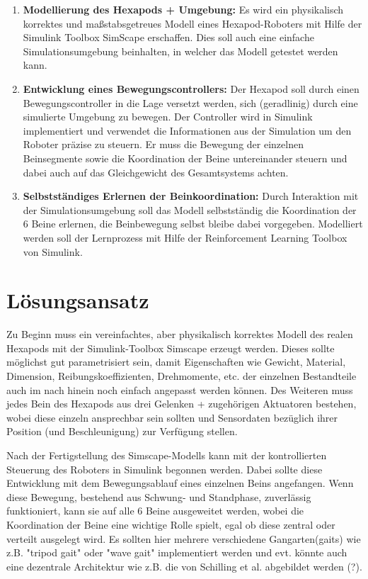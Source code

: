 \begin{enumerate}
	\item \textbf{Modellierung des Hexapods + Umgebung:} Es wird ein physikalisch korrektes und maßstabsgetreues Modell eines Hexapod-Roboters mit Hilfe der Simulink Toolbox SimScape erschaffen.
	Dies soll auch eine einfache Simulationsumgebung beinhalten, in welcher das Modell getestet werden kann. 
	
	\item \textbf{Entwicklung eines Bewegungscontrollers:} Der Hexapod soll durch einen Bewegungscontroller in die Lage versetzt werden, sich (geradlinig) durch eine simulierte Umgebung zu bewegen. 
	Der Controller wird in Simulink implementiert und verwendet die Informationen aus der Simulation um den Roboter präzise zu steuern.
	Er muss die Bewegung der einzelnen Beinsegmente sowie die Koordination der Beine untereinander steuern und dabei auch auf das Gleichgewicht des Gesamtsystems achten.
	
	\item \textbf{Selbstständiges Erlernen der Beinkoordination:} Durch Interaktion mit der Simulationsumgebung soll das Modell selbstständig die Koordination der 6 Beine erlernen, die Beinbewegung selbst bleibe dabei vorgegeben.
	Modelliert werden soll der Lernprozess mit Hilfe der Reinforcement Learning Toolbox von Simulink.
	
\end{enumerate}

\section{Lösungsansatz}
Zu Beginn muss ein vereinfachtes, aber physikalisch korrektes Modell des realen Hexapods mit der Simulink-Toolbox Simscape erzeugt werden.
Dieses sollte möglichst gut parametrisiert sein, damit Eigenschaften wie Gewicht, Material, Dimension, Reibungskoeffizienten, Drehmomente, etc. der einzelnen Bestandteile auch im nach hinein noch einfach angepasst werden können.
Des Weiteren muss jedes Bein des Hexapods aus drei Gelenken + zugehörigen Aktuatoren bestehen, wobei diese einzeln ansprechbar sein sollten und Sensordaten bezüglich ihrer Position (und Beschleunigung) zur Verfügung stellen.

Nach der Fertigstellung des Simscape-Modells kann mit der kontrollierten Steuerung des Roboters in Simulink begonnen werden.
Dabei sollte diese Entwicklung mit dem Bewegungsablauf eines einzelnen Beins angefangen.
Wenn diese Bewegung, bestehend aus Schwung- und Standphase, zuverlässig funktioniert, kann sie auf alle 6 Beine ausgeweitet werden, wobei die Koordination der Beine eine wichtige Rolle spielt, egal ob diese zentral oder verteilt ausgelegt wird.
Es sollten hier mehrere verschiedene Gangarten(gaits) wie z.B. "tripod gait" oder "wave gait" implementiert werden und evt. könnte auch eine dezentrale Architektur wie z.B. die von Schilling et al. abgebildet werden (?).

